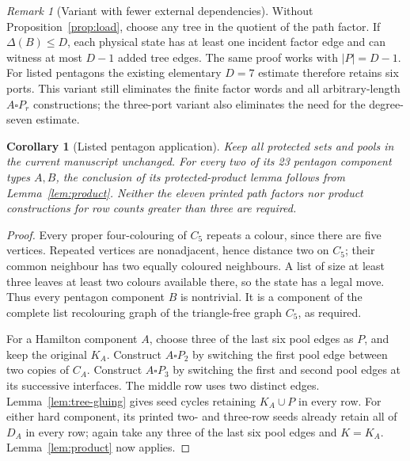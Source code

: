 \documentclass[11pt]{article}
\newtheorem{corollary}[lemma]{Corollary}
\theoremstyle{remark}\newtheorem{remark}[lemma]{Remark}
\begin{document}
\begin{remark}[Variant with fewer external dependencies]
Without Proposition~\ref{prop:load}, choose any tree in the quotient
of the path factor. If $\Delta(B)\le D$, each physical state has at
least one incident factor edge and can witness at most $D-1$ added
tree edges. The same proof works with $|P|=D-1$. For listed pentagons
the existing elementary $D=7$ estimate therefore retains six ports.
This variant still eliminates the finite factor words and all
arbitrary-length $A\square P_r$ constructions; the three-port
variant also eliminates the need for the degree-seven estimate.
\end{remark}

\begin{corollary}[Listed pentagon application]\label{cor:pentagon}
Keep all protected sets and pools in the current manuscript unchanged.
For every two of its 23 pentagon component types $A,B$, the conclusion
of its protected-product lemma follows from Lemma~\ref{lem:product}.
Neither the eleven printed path factors nor product constructions
for row counts greater than three are required.
\end{corollary}
\begin{proof}
Every proper four-colouring of $C_5$ repeats a colour, since there
are five vertices. Repeated vertices are nonadjacent, hence distance
two on $C_5$; their common neighbour has two equally coloured
neighbours. A list of size at least three leaves at least two colours
available there, so the state has a legal move. Thus every pentagon
component $B$ is nontrivial. It is a component of the complete list
recolouring graph of the triangle-free graph $C_5$, as required.

For a Hamilton component $A$, choose three of the last six pool
edges as $P$, and keep the original $K_A$. Construct $A\square P_2$
by switching the first pool edge between two copies of $C_A$.
Construct $A\square P_3$ by switching the first and second pool
edges at its successive interfaces. The middle row uses two distinct
edges. Lemma~\ref{lem:tree-gluing} gives seed cycles retaining
$K_A\cup P$ in every row. For either hard component, its printed
two- and three-row seeds already retain all of $D_A$ in every row;
again take any three of the last six pool edges and $K=K_A$.
Lemma~\ref{lem:product} now applies.
\end{proof}
\end{document}
